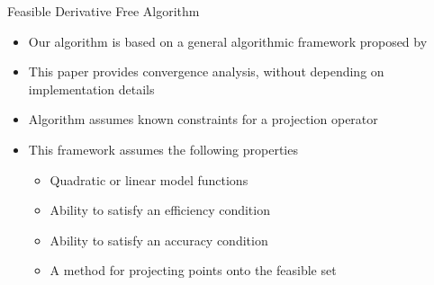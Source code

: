 \documentclass{beamer}
\begin{document}
\begin{frame}{Feasible Derivative Free Algorithm}
	\begin{itemize}
		\item Our algorithm is based on a general algorithmic framework proposed by \cite{CONEJO2013324}
		\item This paper provides convergence analysis, without depending on implementation details
		\item \color{red} Algorithm assumes known constraints for a projection operator \color{black}
		\item This framework assumes the following properties
			\begin{itemize}
				\item Quadratic or linear model functions
				\item Ability to satisfy an efficiency condition
				\item Ability to satisfy an accuracy condition
				\item A method for projecting points onto the feasible set
			\end{itemize}
	\end{itemize}
\end{frame}
\end{document}
